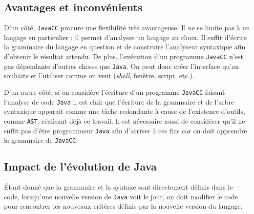 \documentclass[11pt,french]{article}
\begin{document}
        \subsection{Avantages et inconvénients} %
        \label{sub:avantages-inconvenients}
            D'un côté, {\tt JavaCC} procure une flexibilité très avantageuse. Il ne se limite pas à
            un langage en particulier ; il permet d'analyser un langage au choix. Il suffit d'écrire
            la grammaire du langage en question et de construire l'analyseur syntaxique afin
            d'obtenir le résultat attendu. De plus, l'exécution d'un programme {\tt JavaCC} n'est
            pas dépendante d'autres choses que {\tt Java}. On peut donc créer l'interface qu'on
            souhaite et l'utiliser comme on veut ({\it shell}, fenêtre, script, etc.).

            D'un autre côté, si on considère l'écriture d'un programme {\tt JavaCC} faisant
            l'analyse de code {\tt Java} il est clair que l'écriture de la grammaire et de l'arbre
            syntaxique apparait comme une tâche redondante à cause de l'existence d'outils, comme
            {\tt AST}, réalisant déjà ce travail. Il est nécessaire aussi de considérer qu'il ne
            suffit pas d'être programmeur {\tt Java} afin d'arriver à ces fins car on doit apprendre
            la grammaire de {\tt JavaCC}.

        \subsection{Impact de l'évolution de Java} %
        \label{sub:impact-evolution-java}
            Étant donné que la grammaire et la syntaxe sont directement définis dans le code,
            lorsqu'une nouvelle version de {\tt Java} voit le jour, on doit modifier le code
            pour rencontrer les nouveaux critères définis par la nouvelle version du langage.
\end{document}
